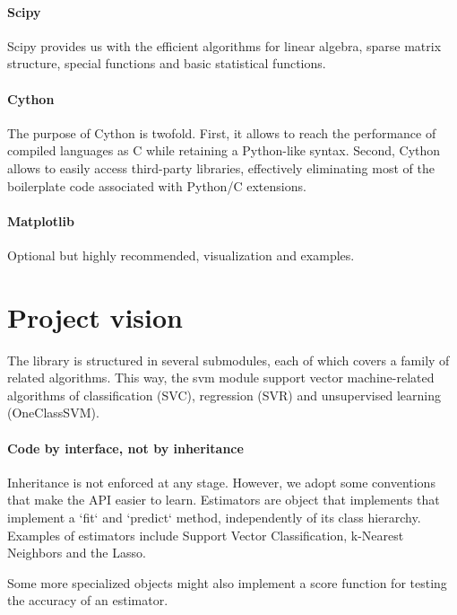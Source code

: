 \documentclass[twoside,11pt]{article}
\begin{document}
\paragraph{Scipy} 

Scipy provides us with the efficient algorithms for linear algebra,
sparse matrix structure, special functions and basic statistical
functions.

\paragraph{Cython}

The purpose of Cython is twofold. First, it allows to reach the
performance of compiled languages as C while retaining a Python-like
syntax. Second, Cython allows to easily access third-party libraries,
effectively eliminating most of the boilerplate code associated with
Python/C extensions.

\paragraph{Matplotlib}

Optional but highly recommended, visualization and examples.



\section {Project vision}


The library is structured in several submodules, each of which covers
a family of related algorithms. This way, the svm module support
vector machine-related algorithms of classification (SVC), regression
(SVR) and unsupervised learning (OneClassSVM).


\paragraph{Code by interface, not by inheritance}

Inheritance is not enforced at any stage. However, we adopt some
conventions that make the API easier to learn. Estimators are object
that implements that implement a `fit` and `predict` method,
independently of its class hierarchy. Examples of estimators include
Support Vector Classification, k-Nearest Neighbors and the Lasso.

Some more specialized objects might also implement a score function
for testing the accuracy of an estimator.
\end{document}
